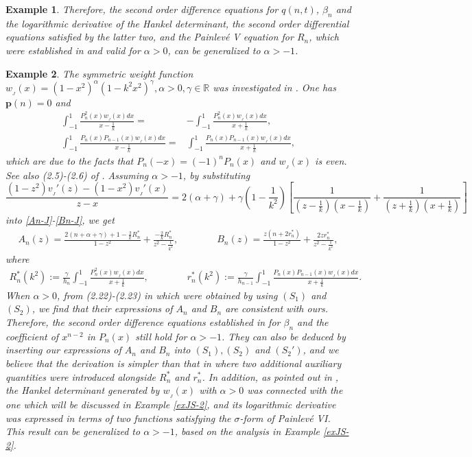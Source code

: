 \documentclass[12pt,a4paper]{article}    %
\newtheorem{exm}{Example}
\numberwithin{equation}{section}
\begin{document}
\begin{exm}
Therefore, the second order difference equations for $q(n,t)$, $\beta_n$ and the logarithmic derivative of the Hankel determinant, the second order differential equations satisfied by the latter two, and the Painlev\'{e} V equation for $R_n$, which were established in \cite{MinChen22} and valid for $\alpha>0$, can be generalized to $\alpha>-1$.
\end{exm}

\begin{exm}
The symmetric weight function $w_{_J}(x)=\left(1-x^2\right)^{\alpha}\left(1-k^2x^2\right)^{\gamma},\alpha>0,\gamma\in\mathbb{R}$ was investigated in \cite{BCH15}. One has $\mathbf{p}(n)=0$ and
\begin{align*}
\int_{-1}^1\frac{P_n^2(x)w_{_J}(x)dx}{x-\frac{1}{k}}=&-\int_{-1}^1\frac{P_n^2(x)w_{_J}(x)dx}{x+\frac{1}{k}},\\
\int_{-1}^1\frac{P_n(x)P_{n-1}(x)w_{_J}(x)dx}{x-\frac{1}{k}}=&\int_{-1}^1\frac{P_n(x)P_{n-1}(x)w_{_J}(x)dx}{x+\frac{1}{k}},
\end{align*}
which are due to the facts that $P_n(-x)=(-1)^nP_n(x)$ and $w_{_J}(x)$ is even. See also (2.5)-(2.6) of \cite{BCH15}.
Assuming $\alpha>-1$, by substituting
\[\frac{(1-z^2)v_{_J}'(z)-(1-x^2)v_{_J}'(x)}{z-x}=2(\alpha+\gamma)+\gamma\left(1-\frac{1}{k^2}\right)\left[\frac{1}{(z-\frac{1}{k})(x-\frac{1}{k})}+\frac{1}{(z+\frac{1}{k})(x+\frac{1}{k})}\right]
\]
into \eqref{An-J}-\eqref{Bn-J}, we get
\begin{align*}
A_n(z)=\frac{2(n+\alpha+\gamma)+1-\frac{2}{k}R_n^*}{1-z^2}+\frac{-\frac{2}{k}R_n^{*}}{z^2-\frac{1}{k^2}},\qquad\qquad B_n(z)=\frac{z(n+2r_n^*)}{1-z^2}+\frac{2zr_n^{*}}{z^2-\frac{1}{k^2}},
\end{align*}
where
\begin{align*}
R_n^{*}(k^2):=\frac{\gamma}{h_n}\int_{-1}^1\frac{P_n^2(x)w_{_J}(x)dx}{x+\frac{1}{k}},\qquad\qquad r_n^{*}(k^2):=\frac{\gamma}{h_{n-1}}\int_{-1}^1\frac{P_n(x)P_{n-1}(x)w_{_J}(x)dx}{x+\frac{1}{k}}.
\end{align*}
When $\alpha>0$, from (2.22)-(2.23) in \cite{BCH15} which were obtained by using $(S_1)$ and $(S_2)$, we find that their expressions of $A_n$ and $B_n$ are consistent with ours. Therefore, the second order difference equations established in \cite{BCH15} for $\beta_n$ and the coefficient of $x^{n-2}$ in $P_n(x)$ still hold for $\alpha>-1$. They can also be deduced by inserting our expressions of $A_n$ and $B_n$ into $(S_1), (S_2)$ and $(S_2')$, and we believe that the derivation is simpler than that in \cite{BCH15} where two additional auxiliary quantities were introduced alongside $R_n^*$ and $r_n^*$. In addition, as pointed out in \cite{BCH15}, the Hankel determinant generated by $w_{_J}(x)$ with $\alpha>0$ was connected with the one which will be discussed in Example \ref{exJS-2}, and its logarithmic derivative was expressed in terms of two functions satisfying the $\sigma$-form of Painlev\'{e} VI. This result can be generalized to $\alpha>-1$, based on the analysis in Example \ref{exJS-2}.
\end{exm}
\end{document}
